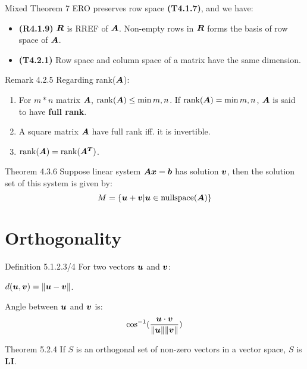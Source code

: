 \documentclass[10pt,portrait]{article}
\begin{document}
\begin{multicols}{2}
\begin{justifying}
\begin{namedthm*}{Mixed Theorem 7}
	ERO preserves row space \textbf{(T4.1.7)}, and we have:
	\begin{itemize}
		\item \textbf{(R4.1.9)} \(\bm{R}\) is RREF of \(\bm{A}\). Non-empty rows in \(\bm{R}\) forms the basis of row space of \(\bm{A}\).
		\item \textbf{(T4.2.1)} Row space and column space of a matrix have the same dimension.
	\end{itemize}
\end{namedthm*}

\begin{namedthm*}{Remark 4.2.5}
	Regarding rank(\(\bm{A}\)):
	\begin{enumerate}
		\item For \(m * n\) matrix \(\bm{A}\), \(\rank(\bm{A}) \le \min{m, n}\). If \(\rank(\bm{A}) = \min{m, n}\), \(\bm{A}\) is said to have \textbf{full rank}.
		\item A square matrix \(\bm{A}\) have full rank iff. it is invertible.
		\item \(\rank(\bm{A}) = \rank(\bm{A^T})\).
	\end{enumerate}
\end{namedthm*}

\begin{namedthm*}{Theorem 4.3.6}
	Suppose linear system \(\bm{A}\bm{x} = \bm{b}\) has solution \(\bm{v}\), then the solution set of this system is given by:
	\[
	    M = \{ \bm{u} + \bm{v} | \bm{u} \in \text{nullspace\((\bm{A})\)}\}
	\]
\end{namedthm*}

\section{Orthogonality}

\begin{namedthm*}{Definition 5.1.2.3/4}
	For two vectors \(\bm{u}\) and \(\bm{v}\):
	
	\(d(\bm{u}, \bm{v}) = \norm{\bm{u} - \bm{v}}\).
	
	Angle between \(\bm{u}\) and \(\bm{v}\) is:
	\[
	    \cos^{-1}(\frac{\bm{u}\cdot\bm{v}}{\norm{\bm{u}}\norm{\bm{v}}})
	\]
\end{namedthm*}

\begin{namedthm*}{Theorem 5.2.4}
	If \(S\) is an orthogonal set of non-zero vectors in a vector space, \(S\) is \textbf{LI}.
\end{namedthm*}


\end{justifying}
\end{multicols}
\end{document}
